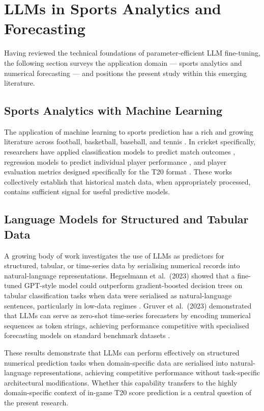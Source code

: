 \section{LLMs in Sports Analytics and Forecasting}

Having reviewed the technical foundations of parameter-efficient LLM fine-tuning, the following section surveys the application domain --- sports analytics and numerical forecasting --- and positions the present study within this emerging literature.

\subsection{Sports Analytics with Machine Learning}

The application of machine learning to sports prediction has a rich and growing literature across football, basketball, baseball, and tennis \cite{haghighat2013review}. In cricket specifically, researchers have applied classification models to predict match outcomes \cite{ahmad2011predicting}, regression models to predict individual player performance \cite{iyer2009prediction}, and player evaluation metrics designed specifically for the T20 format \cite{davis2015markov}. These works collectively establish that historical match data, when appropriately processed, contains sufficient signal for useful predictive models.

\subsection{Language Models for Structured and Tabular Data}

A growing body of work investigates the use of LLMs as predictors for structured, tabular, or time-series data by serialising numerical records into natural-language representations. Hegselmann et al.\ (2023) showed that a fine-tuned GPT-style model could outperform gradient-boosted decision trees on tabular classification tasks when data were serialised as natural-language sentences, particularly in low-data regimes \cite{hegselmann2023tabllm}. Gruver et al.\ (2023) demonstrated that LLMs can serve as zero-shot time-series forecasters
by encoding numerical sequences as token strings, achieving performance competitive with
specialised forecasting models on standard benchmark datasets \cite{gruver2023large}.

These results demonstrate that LLMs can perform effectively on structured numerical prediction tasks when domain-specific data are serialised into natural-language representations, achieving competitive performance without task-specific architectural modifications. Whether this capability transfers to the highly domain-specific context of in-game T20 score prediction is a central question of the present research.

